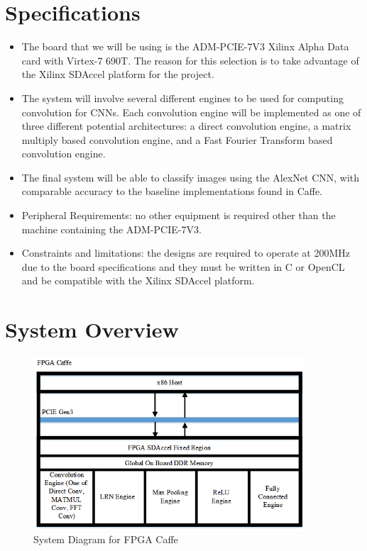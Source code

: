 \documentclass[conference,compsoc]{IEEEtran/IEEEtran}
\begin{document}
\section{Specifications}\label{section:spec}

\begin{itemize}
\item The board that we will be using is the ADM-PCIE-7V3 Xilinx Alpha Data card
with Virtex-7 690T. The reason for this selection is to take advantage of the
Xilinx SDAccel platform for the project.

\item The system will involve several different engines to be used for computing
convolution for CNNs. Each convolution engine
will be implemented as one of three different potential architectures: a direct
convolution engine, a matrix multiply based convolution engine, and a Fast Fourier
Transform based convolution engine.

\item The final system will be able to classify images using the AlexNet CNN, with
comparable accuracy to the baseline implementations found in Caffe.

\item Peripheral Requirements: no other equipment is required other than the machine
containing the ADM-PCIE-7V3.

\item Constraints and limitations: the designs are required to operate at 200MHz due
to the board specifications and they must be written in C or OpenCL and be compatible
with the Xilinx SDAccel platform.
\end{itemize}

\section{System Overview}\label{section:overview}

\begin{figure}[ht]
    \centering
    \includegraphics[width=0.9\textwidth]{system_diagram.png}
    \caption{System Diagram for FPGA Caffe}
    \label{fig:system_diag}
\end{figure}
\end{document}
